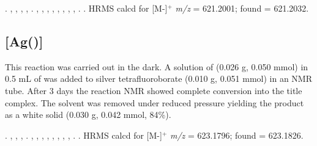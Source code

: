 .
,
,
,
,
.
,
,
,
,
,
,
, %
,
.
.
HRMS calcd for  [M-]$^+$ \emph{m/z} = 621.2001; found = 621.2032.



\subsection*{\texorpdfstring{[Ag(\tButhixantphos)]} A}


This reaction was carried out in the dark.  A solution of \tButhixantphos{} (0.026 g, 0.050 mmol) in 0.5 mL of  was added to silver tetrafluoroborate (0.010 g, 0.051 mmol) in an NMR tube.  After 3 days the reaction NMR showed complete conversion into the title complex.  The solvent was removed under reduced pressure yielding the product as a white solid (0.030 g, 0.042 mmol, 84\%).

\begin{sloppypar}
.
,
,
,
.
,
,
,
,
,
, %
,
,
.
.
HRMS calcd for  [M-]$^+$ \emph{m/z} = 623.1796; found = 623.1826.
\end{sloppypar}

